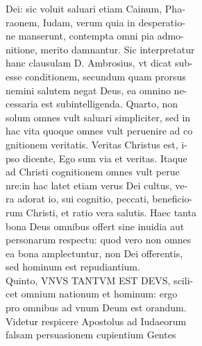 \documentclass{article}
\begin{document}
\begin{pages}
                Dei: sic voluit saluari etiam Cainum, Pha- \\
                raonem, Iudam, verum quia in desperatio- \\
                ne manserunt, contempta omni pia admo- \\
                nitione, merito damnantur. Sic interpretatur \\
                hanc clausulam D. Ambrosius, vt dicat sub- \\
                esse conditionem, secundum quam prorsus \\
                nemini salutem negat Deus, ea omnino ne- \\
                cessaria est subintelligenda. Quarto, non \\
                solum omnes vult saluari simpliciter, sed in \\
                hac vita quoque omnes vult peruenire ad co \\
                gnitionem veritatis. Veritas Christus est, i- \\
                pso dicente, Ego sum via et veritas. Itaque \\
                ad Christi cognitionem omnes vult perue \\
                nre:in hac latet etiam verus Dei cultus, ve- \\
                ra adorat io, sui cognitio, peccati, beneficio- \\
                rum Christi, et ratio vera salutis. Haec tanta \\
                bona Deus omnibus offert sine inuidia aut \\
                personarum respectu: quod vero non omnes \\
                ea bona amplectuntur, non Dei offerentis, \\
                sed hominum est repudiantium. \\
                Quinto, VNVS TANTVM EST DEVS, scili- \\
                cet omnium nationum et hominum: ergo \\
                pro omnibus ad vnum Deum est orandum. \\
                Videtur respicere Apostolus ad Iudaeorum \\
                falsam persuasionem cupientium Gentes \\

\end{pages}
\end{document}
